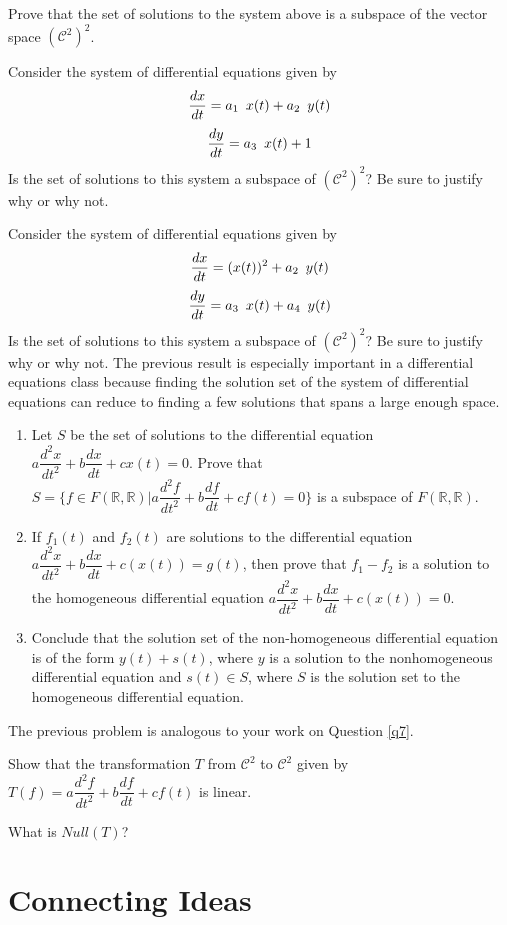 \item Prove that the set of solutions to the system above is a subspace of the vector space $(\mathcal{C}^2)^2$.
\item Consider the system of differential equations given by $$\dfrac{dx}{dt} = a_1 \enskip x(t)+a_2 \enskip y(t)$$ $$\dfrac{dy}{dt} = a_3 \enskip x(t) + 1  $$
Is the set of solutions to this system a subspace of $(\mathcal{C}^2)^2$? Be sure to justify why or why not.
\item \item Consider the system of differential equations given by $$\dfrac{dx}{dt} =  (x(t))^2 +a_2 \enskip y(t)$$ $$\dfrac{dy}{dt} = a_3 \enskip x(t) + a_4 \enskip y(t)  $$
Is the set of solutions to this system a subspace of $(\mathcal{C}^2)^2$? Be sure to justify why or why not.
\ee
\eq
The previous result is especially important in a differential equations class because finding the solution set of the system of differential equations can reduce to finding a few solutions that spans a large enough space.

\bq \begin{enumerate}
\item Let $S$ be the set of solutions to the differential equation $a\dfrac{d^2x}{dt^2}+b\dfrac{dx}{dt}+c x(t)= 0$. Prove that $S=\{f \in F(\mathbb{R},\mathbb{R}) | a\dfrac{d^2f}{dt^2}+b\dfrac{df}{dt}+c f(t)= 0 \}$  is a subspace of $F(\mathbb{R},\mathbb{R})$.
\item If $f_1(t)$ and $f_2(t)$ are solutions to the differential equation $a\dfrac{d^2x}{dt^2}+b\dfrac{dx}{dt}+c (x(t))= g(t)$, then prove that $f_1-f_2$ is a solution to the homogeneous differential equation $a\dfrac{d^2x}{dt^2}+b\dfrac{dx}{dt}+c (x(t))= 0$.
\item Conclude that the solution set of the non-homogeneous differential equation is of the form $y(t)+s(t)$, where $y$ is a solution to the nonhomogeneous differential equation and $s(t) \in S$, where $S$ is the solution set to the homogeneous differential equation.
\end{enumerate}
\eq
The previous problem is analogous to your work on Question \ref{q7}.
\bq \be
\item Show that the transformation $T$ from $\mathcal{C}^2$ to $\mathcal{C}^2$ given by $T(f)=a\dfrac{d^2f}{dt^2}+b\dfrac{df}{dt}+c f(t)$ is linear.
\item What is $Null(T)$?
\ee
\eq

\chapter{Connecting Ideas}

